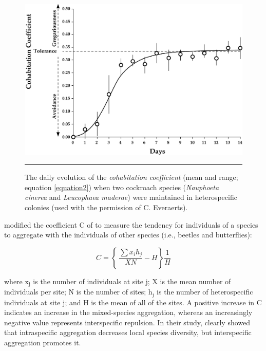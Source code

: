  \begin{figure}[ht]
	\centering
		\includegraphics[width=0.9 \textwidth]{Figures/everaert_these.png}
		\rule{35em}{0.5pt}
	\caption[Ever]{The daily evolution of the \textit{cohabitation coefficient} (mean and range; equation \ref{equation2}) when two cockroach species (\textit{Nauphoeta cinerea} and \textit{Leucophaea maderae}) were maintained in heterospecific colonies (used with the permission of C. Everaerts).}
	\label{fig:ever}

\end{figure}

\citet{veech_intraspecific_2003} modified the coefficient C of \citet{ives_aggregation_1991} to measure the tendency for individuals of a species to aggregate with the individuals of other species (i.e., beetles and butterflies):

\begin{equation}
	\label{equation3}
		C= \left\lbrace\ \frac{\sum x_{i}h_{j}}{XN} - H \right\rbrace	\frac{1}{H}  
\end{equation}

where $\text{x}_{\text{j}}$ is the number of individuals at site j; X is the mean number of individuals per site; N is the number of sites; $\text{h}_{\text{j}}$ is the number of heterospecific individuals at site j; and H is the mean of all of the sites. A positive increase in C indicates an increase in the mixed-species aggregation, whereas an increasingly negative value represents interspecific repulsion. In their study, \citet{veech_intraspecific_2003} clearly showed that intraspecific aggregation decreases local species diversity, but interspecific aggregation promotes it.



